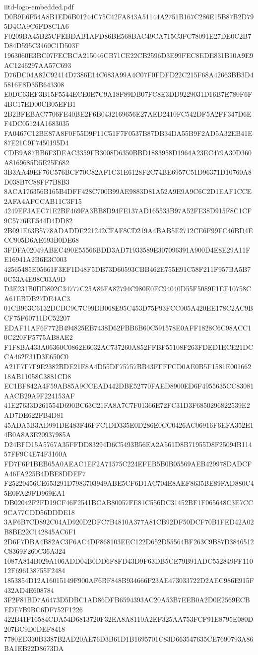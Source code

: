 \begin{filecontents*}[overwrite]{iitd-logo-embedded.pdf}
D0B9E6F54A8B1ED6B01244C75C42FA843A51144A2751B167C286E15B87B2D795D4CA9C6FD8C1A6
F0209BA45B25CFEBDAB1AFD86BE568BAC49CA715C3FC78091E27DE0C2B7D84D595C3460C1D503F
1963060E3BC07FECBCA215046CB71CE22CB2596D3E99FEC8EDE831B10A9E9AC1246297AA57C693
D76DC04A82C92414D7386E14C683A99A4C07F0FDFD22C215F68A42663BB3D45816E8D35B643308
E0DC63EF3B15F5544ECE0E7C9A18F89DB07FC8E3DD9229031D16B7E780F6F4BC17ED00CB05EFB1
2B2BFEBAC7706FE40BE2F6B0432169656E27AED2410FC542DF5A2FF347D6EF4DC05124A1683035
FA0467C12BE87A8F0F55D9F11C51F7F0537B87DB34DA55B9F2AD5A32EB41E87E21C9F7450195D4
CDB9A87BB6F3DEAC3359FB3008D6350BBD1883958D1964A23EC479A30D360A8169685D5E25E682
3B3AA49EF76C576BCF70C82AF1C31E6128F2C74BE6957C51D96371D10760A8D038B7C88FF7B8B3
8ACA176356B165B4DFF428C700B99AE9883D81A52A9E9A9C6C2D1EAF1CCE2AFA4AFCCAB11C3F15
4249EF3AEC71E2BF469FA3BB8D94FE137AD165533B97A52FE38D915F8C1CF9C5776EE544D4DD82
2B091E63B5778ADADDF221242CFAF8CD219A4BAB5E2712CE6F99FC46BD4ECC905D6AE693B0DE68
3FDFA02049ABEC490E55566BDD3AD71933589E307096391A900D4E8E29A11FE16941A2B6E3C003
42565485E05661F3EF1D48F5DB73D60593CBB462E755E91C58F211F957BA5B70C53A4E98C03A9D
D3E231B0DD802C34777C25A86FA82794C980E0FC94040D55F5089F1EE10758CA61EBDB27DE4AC3
01CB963C6132DCBC9C7C99DB068E95C453D75F93FCC005A420EE178C2AC9BCF75F60711DC52207
EDAF11AF6F772B494825EB7438D62FBB6B60C591578E0AFF1828C6C98ACC10C220FF5775AB8AE2
F1F8BA433A06360C0862E6032AC737260A852FFBF55108F263FDED1ECE21DCCA462F31D3E650C0
A21F7F7F9E2382BDE21F8A4D55DF75757BB43FFFFCD0AE0B5F1581E00166218AB11058C3881CD8
EC1BF842A4F59AB85A9CCEAD442DBE52770FAED8900ED6F4955635CC83081AACB29A9F224153AF
41E27633D261554D690BC63C21FA8A7C7F01366E72FC31D3F6850296822539E2AD7DE622FB4D81
45ADA5B3AD991DE483F46FFC1DD335E0D286E0CC0426AC06916F6EFA352E14B0A8A3E20937985A
D24BFD15A5767A35FFDD83294D6C5493B56EA2A561D8B71955D8F25094B11457FF9C4E74F3160A
FD7F6F1BEB65A0AEAC1EF2A71575C224EFEB5B0B05569AEB429978DADCFA46FA225B4DBE8DDEF7
F25220456CE653291D7983703949ABE5CF6D1AC704E8AEF8635BE89FAD880C45E0FA29FD969EA1
DB02042F2FD19CF46F2541BCAB80057FE81C556DC31452BF1F065648C3E7CC9CA77CDD56DDDE18
3AF6B7CD892C04AD920D2DFC7B4810A377A81CB92DF50DCF70B1FED42A02B8BE22C142845AC6F1
2D6F7DBA4B82AC3F6AC4DF868103EEC122D652D55564BF263C9B87D3846512C8369F260C36A324
1087A814B029A106ADD04B0DD6F8FD43D9F63DB5CE79B91ADC552849FF11012F696138755F2484
1853854D12A16015149F900AF6BF848B934666F23AE473033722D2AEC986E915F432AD4E608784
3F2F81BD7A6473D5DBC1AD86DFB6594393AC20A53B7EEB0A2D0E2569ECBEDE7B9BC6DF752F1226
422B41F16584CDA54D6813720F32EA8A8110A2EF325AA753FCF91E8795E080D207BC9D0DEF8418
7780ED330B3387B2AD20AE76D3B61D1B1695701C83D663547635CE7690793A86BA1EB22D8673DA

\end{filecontents*}
